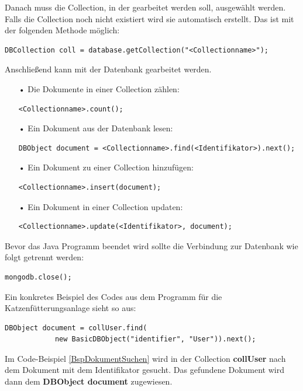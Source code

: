Danach muss die Collection, in der gearbeitet werden soll, ausgewählt werden. Falls die Collection noch nicht existiert wird sie automatisch erstellt. Das ist mit der folgenden Methode möglich:
\begin{lstlisting}[style=JavaStyle, caption=Collection auswählen]
	DBCollection coll = database.getCollection("<Collectionname>");
\end{lstlisting}
Anschließend kann mit der Datenbank gearbeitet werden. 
\begin{itemize}
\item[•] Die Dokumente in einer Collection zählen:
\begin{lstlisting}[style=JavaStyle, caption=Anzahl der Collections zählen]
	<Collectionname>.count();
\end{lstlisting}
\item[•] Ein Dokument aus der Datenbank lesen:
\begin{lstlisting}[style=JavaStyle, caption=Nach Dokument suchen]
	DBObject document = <Collectionname>.find(<Identifikator>).next();
\end{lstlisting}
\item[•] Ein Dokument zu einer Collection hinzufügen:
\begin{lstlisting}[style=JavaStyle, caption=Ein Dokument hinzufügen]
	<Collectionname>.insert(document);
\end{lstlisting}	
\item[•] Ein Dokument in einer Collection updaten:
\begin{lstlisting}[style=JavaStyle, caption=Ein Dokument updaten]
	<Collectionname>.update(<Identifikator>, document);
\end{lstlisting}
\end{itemize}

Bevor das Java Programm beendet wird sollte die Verbindung zur Datenbank wie folgt getrennt werden: 
\begin{lstlisting}[style=JavaStyle, caption=Verbindung zur Datenbank trennen]
	mongodb.close();
\end{lstlisting}

Ein konkretes Beispiel des Codes aus dem Programm für die Katzenfütterungsanlage sieht so aus:
\begin{lstlisting}[style=JavaStyle, caption=Konkretes Beispiel: Dokument suchen, label=BspDokumentSuchen]
	DBObject document = collUser.find(
			new BasicDBObject("identifier", "User")).next();
\end{lstlisting}
Im Code-Beispiel \ref{BspDokumentSuchen} wird in der Collection \textbf{collUser} nach dem Dokument mit dem Identifikator \textbf{} gesucht. Das gefundene Dokument wird dann dem \textbf{DBObject document} zugewiesen. 



